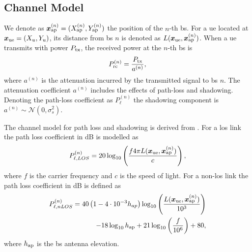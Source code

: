 \documentclass[conference]{IEEEtran}
\begin{document}

\subsection{Channel Model}

We denote as $\bm{x}_{\rm ap}^{(n)} =(X_{\rm ap}^{(n)},Y_{\rm ap}^{(n)})$ the position of the $n$-th \ac{bs}. For a \ac{ue} located at $\bm{x}_{\rm ue}=(X_u,Y_u)$, its distance from \ac{bs} $n$ is denoted as $L(\bm{x}_{\rm ue},\bm{x}_{\rm ap}^{(n)})$. When a \ac{ue} transmits with power $P_{\rm tx}$, the received power at the $n$-th \ac{bs} is
\begin{equation}\label{eq: rec pow}
    P_{\rm rc}^{(n)}= \frac{P_{\rm tx}}{a^{(n)}},
\end{equation}
where $a^{(n)}$ is the attenuation incurred by the transmitted signal to \ac{bs} $n$. The attenuation coefficient $a^{(n)}$ includes the effects of path-loss and shadowing. Denoting the path-loss coefficient as $P_{\ell}^{(n)}$  the shadowing component is $a^{(n)} \sim \mathcal{N}(0,\sigma_s^2)$.

The channel model for path loss and shadowing is derived from \cite{3gpp}. For a \ac{los} link the path loss coefficient in dB is modelled as
\begin{equation}\label{eq:los}
    P_{\ell,LOS}^{(n)} = 20\log_{10}\left(\frac{f 4\pi L(\bm{x}_{\rm ue},\bm{x}_{\rm ap}^{(n)})}{c}\right),
\end{equation}
where $f$ is the carrier frequency and $c$ is the speed of light. For a  non-\ac{los} link the path loss coefficient in dB is defined as
\begin{equation}
\begin{split}
    P_{\ell, nLOS}^{(n)} = 40\left(1-4 \cdot 10^{-3}  h_{ap}\right) \log_{10}\left (\frac{L(\bm{x}_{\rm ue},\bm{x}_{\rm ap}^{(n)})}{10^3}\right ) \\
    -18\log_{10}h_{\rm ap}
    + 21\log_{10}\left(\frac{f}{10^6}\right) + 80,
    \end{split}
\end{equation}
where $h_{\rm ap}$ is the \ac{bs} antenna elevation.
\end{document}
